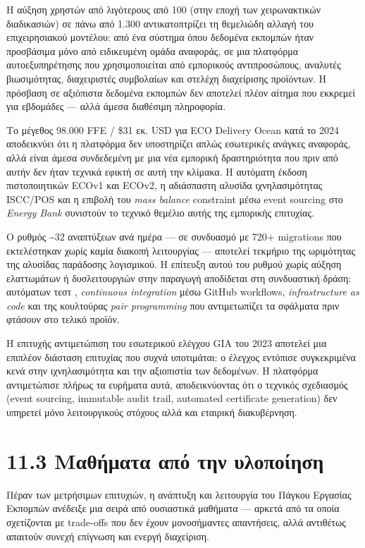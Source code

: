 Η αύξηση χρηστών από λιγότερους από 100 (στην εποχή των χειρωνακτικών
διαδικασιών) σε πάνω από 1.300 αντικατοπτρίζει τη θεμελιώδη αλλαγή του
επιχειρησιακού μοντέλου: από ένα σύστημα όπου δεδομένα εκπομπών ήταν
προσβάσιμα μόνο από ειδικευμένη ομάδα αναφοράς, σε μια πλατφόρμα
αυτοεξυπηρέτησης που χρησιμοποιείται από εμπορικούς αντιπροσώπους,
αναλυτές βιωσιμότητας, διαχειριστές συμβολαίων και στελέχη διαχείρισης
προϊόντων. Η πρόσβαση σε αξιόπιστα δεδομένα εκπομπών δεν αποτελεί πλέον
αίτημα που εκκρεμεί για εβδομάδες --- αλλά άμεσα διαθέσιμη πληροφορία.

Το μέγεθος 98.000 FFE / \$31 εκ. USD για ECO Delivery Ocean κατά το 2024
αποδεικνύει ότι η πλατφόρμα δεν υποστηρίζει απλώς εσωτερικές ανάγκες
αναφοράς, αλλά είναι άμεσα συνδεδεμένη με μια νέα εμπορική δραστηριότητα
που πριν από αυτήν δεν ήταν τεχνικά εφικτή σε αυτή την κλίμακα. Η
αυτόματη έκδοση πιστοποιητικών ECOv1 και ECOv2, η αδιάσπαστη αλυσίδα
ιχνηλασιμότητας ISCC/POS και η επιβολή του \emph{mass balance}
constraint μέσω event sourcing στο \emph{Energy Bank} συνιστούν το
τεχνικό θεμέλιο αυτής της εμπορικής επιτυχίας.

Ο ρυθμός \textasciitilde32 αναπτύξεων ανά ημέρα --- σε συνδυασμό με 720+
migrations που εκτελέστηκαν χωρίς καμία διακοπή λειτουργίας --- αποτελεί
τεκμήριο της ωριμότητας της αλυσίδας παράδοσης λογισμικού. Η επίτευξη
αυτού του ρυθμού χωρίς αύξηση ελαττωμάτων ή δυσλειτουργιών στην παραγωγή
αποδίδεται στη συνδυαστική δράση: αυτόματων τεστ , \emph{continuous
integration} μέσω GitHub workflows, \emph{infrastructure as code} και
της κουλτούρας \emph{pair programming} που αντιμετωπίζει τα σφάλματα
πριν φτάσουν στο τελικό προϊόν.

Η επιτυχής αντιμετώπιση του εσωτερικού ελέγχου GIA του 2023 αποτελεί μια
επιπλέον διάσταση επιτυχίας που συχνά υποτιμάται: ο έλεγχος εντόπισε
συγκεκριμένα κενά στην ιχνηλασιμότητα και την αξιοπιστία των δεδομένων.
Η πλατφόρμα αντιμετώπισε πλήρως τα ευρήματα αυτά, αποδεικνύοντας ότι ο
τεχνικός σχεδιασμός (event sourcing, immutable audit trail, automated
certificate generation) δεν υπηρετεί μόνο λειτουργικούς στόχους αλλά και
εταιρική διακυβέρνηση.

\section{11.3 Μαθήματα από την
υλοποίηση}\label{ux3bcux3b1ux3b8ux3aeux3bcux3b1ux3c4ux3b1-ux3b1ux3c0ux3cc-ux3c4ux3b7ux3bd-ux3c5ux3bbux3bfux3c0ux3bfux3afux3b7ux3c3ux3b7}

Πέραν των μετρήσιμων επιτυχιών, η ανάπτυξη και λειτουργία του Πάγκου
Εργασίας Εκπομπών ανέδειξε μια σειρά από ουσιαστικά μαθήματα --- αρκετά
από τα οποία σχετίζονται με trade-offs που δεν έχουν μονοσήμαντες
απαντήσεις, αλλά αντιθέτως απαιτούν συνεχή επίγνωση και ενεργή
διαχείριση.

